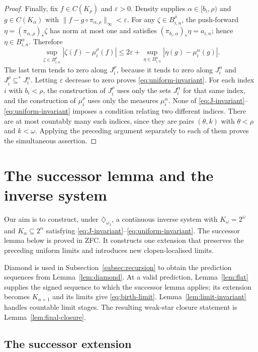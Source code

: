 \documentclass[a4paper,11pt]{amsart}
\theoremstyle{plain}
\theoremstyle{definition}
\theoremstyle{remark}
\newcommand{\eps}{\varepsilon}
\numberwithin{equation}{section}
\begin{document}
\begin{proof}
Finally, fix $f\in C(K_\rho)$ and $\eps>0$.  Density supplies $\alpha\in[b_i,\rho)$ and $g\in C(K_\alpha)$ with
$\|f-g\circ\pi_{\alpha,\rho}\|_\infty<\eps$.
For any $\zeta\in B_{i,n}^\rho$, the push-forward
$\eta=(\pi_{\alpha,\rho})_*\zeta$ has norm at most one and satisfies
$(\pi_{b_i,\alpha})_*\eta=a_{i,n}$; hence $\eta\in B_{i,n}^\alpha$.  Therefore
\[
 \sup_{\zeta\in B_{i,n}^\rho}|\zeta(f)-\mu_i^\rho(f)|
 \leqslant 2\eps+
 \sup_{\eta\in B_{i,n}^\alpha}|\eta(g)-\mu_i^\alpha(g)|.
\]
The last term tends to zero along $J_i^\rho$, because it tends to zero along $J_i^\alpha$ and $J_i^\rho\subseteq^*J_i^\alpha$.  Letting $\eps$ decrease to zero proves \eqref{eq:uniform-invariant}.  For each index $i$ with $b_i<\rho$, the construction of $J_i^\rho$ uses only the sets $J_i^\alpha$ for that same index, and the construction of $\mu_i^\rho$ uses only the measures $\mu_i^\alpha$.  None of \eqref{eq:J-invariant}--\eqref{eq:uniform-invariant} imposes a condition relating two different indices.  There are at most countably many such indices, since they are pairs $(\theta,k)$ with $\theta<\rho$ and $k<\omega$.  Applying the preceding argument separately to each of them proves the simultaneous assertion.
\end{proof}

\section{The successor lemma and the inverse system}\label{sec:successor}\label{sec:recursion}

Our aim is to construct, under $\diamondsuit_{\omega_1}$, a continuous
inverse system with $K_\omega=2^\omega$ and $K_\alpha\subseteq2^\alpha$
satisfying \eqref{eq:J-invariant}--\eqref{eq:uniform-invariant}.
The successor lemma below is proved in ZFC. It constructs one extension
that preserves the preceding uniform limits and introduces new
clopen-localised limits.

Diamond is used in Subsection~\ref{subsec:recursion} to obtain the
prediction sequences from Lemma~\ref{lem:diamond}.
At a valid prediction, Lemma~\ref{lem:flat} supplies the signed sequence
to which the successor lemma applies; its extension becomes
$K_{\alpha+1}$ and its limits give \eqref{eq:birth-limit}.
Lemma~\ref{lem:limit-invariant} handles countable limit stages.
The resulting weak-star closure statement is Lemma~\ref{lem:final-closure}.

\subsection{The successor extension}\label{subsec:successor}
\end{document}
